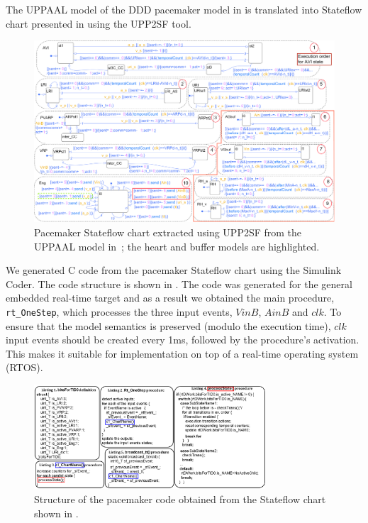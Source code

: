 

The UPPAAL model of the DDD pacemaker model in  is translated into Stateflow chart presented in  using the UPP2SF tool.
\begin{figure} [!t]
\center
\includegraphics[width=1.00\textwidth]{figs/PM_SF_buffer_newC1.png} 
\caption{Pacemaker Stateflow chart extracted using UPP2SF from the UPPAAL model in~; the heart and buffer models are highlighted.} 
\label{fig:PM_sf}
\end{figure}

We generated C code from the pacemaker Stateflow chart using the Simulink Coder. The code structure is shown in .
The code was generated for the general embedded real-time target and as a result we obtained the main procedure, \texttt{rt\_OneStep}, which processes the three input events, $VinB$, $AinB$ and $clk$. To ensure that the model semantics is preserved (modulo the execution time), $clk$ input events should be created every 1ms, followed by the procedure's activation. This makes it suitable for implementation on top of a real-time operating system (RTOS).

\begin{figure} [!t]
\center
\includegraphics[width=0.77\textwidth]{figs/CodeListingFinal.png}
\caption{Structure of the pacemaker code obtained from the Stateflow chart shown in .}
\label{fig:pm_code}
\end{figure}


